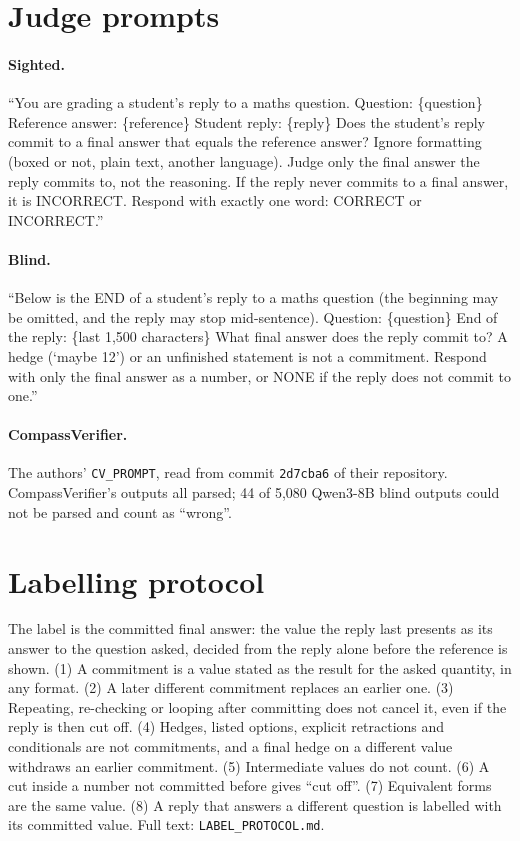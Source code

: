 \documentclass[10pt]{article}
\begin{document}
\section{Judge prompts}
\label{app:prompts}
\paragraph{Sighted.} ``You are grading a student's reply to a maths question. Question: \{question\}
Reference answer: \{reference\} Student reply: \{reply\} Does the student's reply commit to a final answer
that equals the reference answer? Ignore formatting (boxed or not, plain text, another language). Judge only
the final answer the reply commits to, not the reasoning. If the reply never commits to a final answer, it
is INCORRECT. Respond with exactly one word: CORRECT or INCORRECT.''

\paragraph{Blind.} ``Below is the END of a student's reply to a maths question (the beginning may be
omitted, and the reply may stop mid-sentence). Question: \{question\} End of the reply: \{last 1,500
characters\} What final answer does the reply commit to? A hedge (`maybe 12') or an unfinished statement is
not a commitment. Respond with only the final answer as a number, or NONE if the reply does not commit to
one.''

\paragraph{CompassVerifier.} The authors' \texttt{CV\_PROMPT}, read from commit \texttt{2d7cba6} of their
repository. CompassVerifier's outputs all parsed; 44 of 5,080 Qwen3-8B blind outputs could not be parsed and count as ``wrong''.

\section{Labelling protocol}
\label{app:protocol}
The label is the committed final answer: the value the reply last presents as its answer to the question
asked, decided from the reply alone before the reference is shown. (1) A commitment is a value stated as the
result for the asked quantity, in any format. (2) A later different commitment replaces an earlier one.
(3) Repeating, re-checking or looping after committing does not cancel it, even if the reply is then cut
off. (4) Hedges, listed options, explicit retractions and conditionals are not commitments, and a final
hedge on a different value withdraws an earlier commitment. (5) Intermediate values do not count. (6) A cut
inside a number not committed before gives ``cut off''. (7) Equivalent forms are the same value. (8) A
reply that answers a different question is labelled with its committed value. Full text:
\texttt{LABEL\_PROTOCOL.md}.
\end{document}
